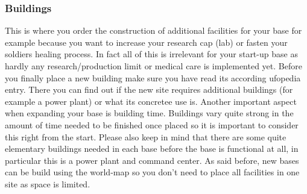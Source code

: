 \subsubsection{Buildings}
This is where you order the construction of additional facilities for your base for example because you want to increase your research cap (lab) or fasten your soldiers healing process.
In fact all of this is irrelevant for your start-up base as hardly any research/production limit or medical care is implemented yet. Before you finally place a new building make sure you have read its according ufopedia entry. There you can find out if the new site requires additional buildings (for example a power plant) or what its concretee use is. Another important aspect when expanding your base is building time. Buildings vary quite strong in the amount of time needed to be finished once placed so it is important to consider this right from the start. Please also keep in mind that there are some quite elementary buildings needed in each base before the base is functional at all, in particular this is a power plant and command center. As said before, new bases can be build using the world-map so you don't need to place all facilities in one site as space is limited.

